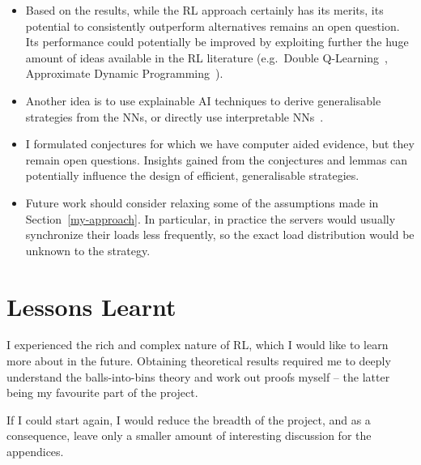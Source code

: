 \begin{itemize}
    \item Based on the results, while the RL approach certainly has its merits, its potential to consistently outperform alternatives remains an open question. Its performance could potentially be improved by exploiting further the huge amount of ideas available in the RL literature (e.g.\ Double Q-Learning~\cite{hasselt2010doubleqlearning}, Approximate Dynamic Programming~\cite{bellman1959approximatedp}).
    
    \item Another idea is to use explainable AI techniques to derive generalisable strategies from the NNs, or directly use interpretable NNs~\cite{vacareanu2022explainableAI1, tang2022explainableAI2}.
    
    \item I formulated conjectures for which we have computer aided evidence, but they remain open questions. Insights gained from the conjectures and lemmas can potentially influence the design of efficient, generalisable strategies.
    
    \item Future work should consider relaxing some of the assumptions made in Section~\ref{my-approach}. In particular, in practice the servers would usually synchronize their loads less frequently, so the exact load distribution would be unknown to the strategy.
\end{itemize}



\section{Lessons Learnt}

I experienced the rich and complex nature of RL, which I would like to learn more about in the future. Obtaining theoretical results required me to deeply understand the balls-into-bins theory and work out proofs myself -- the latter being my favourite part of the project.

If I could start again, I would reduce the breadth of the project, and as a consequence, leave only a smaller amount of interesting discussion for the appendices.

